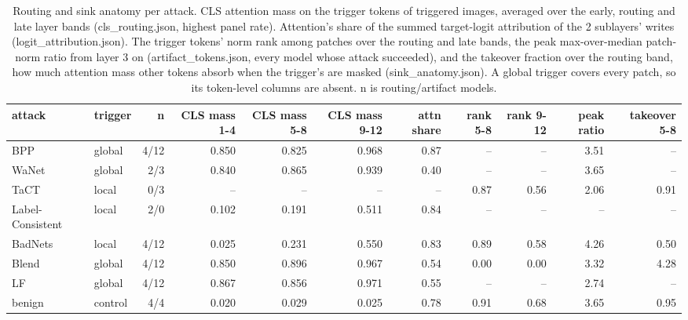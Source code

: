 \begin{table}[htbp]
\centering
\small
\caption{Routing and sink anatomy per attack. CLS attention mass on the trigger tokens of triggered images, averaged over the early, routing and late layer bands (cls\_routing.json, highest panel rate). Attention's share of the summed target-logit attribution of the 2 sublayers' writes (logit\_attribution.json). The trigger tokens' norm rank among patches over the routing and late bands, the peak max-over-median patch-norm ratio from layer 3 on (artifact\_tokens.json, every model whose attack succeeded), and the takeover fraction over the routing band, how much attention mass other tokens absorb when the trigger's are masked (sink\_anatomy.json). A global trigger covers every patch, so its token-level columns are absent. n is routing/artifact models.}
\label{tab:routing}
\begin{adjustbox}{max width=\linewidth}
\begin{tabular}{llrrrrrrrrr}
\toprule
attack & trigger & n & CLS mass 1-4 & CLS mass 5-8 & CLS mass 9-12 & attn share & rank 5-8 & rank 9-12 & peak ratio & takeover 5-8 \\
\midrule
BPP & global & 4/12 & 0.850 & 0.825 & 0.968 & 0.87 & -- & -- & 3.51 & -- \\
WaNet & global & 2/3 & 0.840 & 0.865 & 0.939 & 0.40 & -- & -- & 3.65 & -- \\
TaCT & local & 0/3 & -- & -- & -- & -- & 0.87 & 0.56 & 2.06 & 0.91 \\
Label-Consistent & local & 2/0 & 0.102 & 0.191 & 0.511 & 0.84 & -- & -- & -- & -- \\
BadNets & local & 4/12 & 0.025 & 0.231 & 0.550 & 0.83 & 0.89 & 0.58 & 4.26 & 0.50 \\
Blend & global & 4/12 & 0.850 & 0.896 & 0.967 & 0.54 & 0.00 & 0.00 & 3.32 & 4.28 \\
LF & global & 4/12 & 0.867 & 0.856 & 0.971 & 0.55 & -- & -- & 2.74 & -- \\
benign & control & 4/4 & 0.020 & 0.029 & 0.025 & 0.78 & 0.91 & 0.68 & 3.65 & 0.95 \\
\bottomrule
\end{tabular}
\end{adjustbox}
\end{table}
